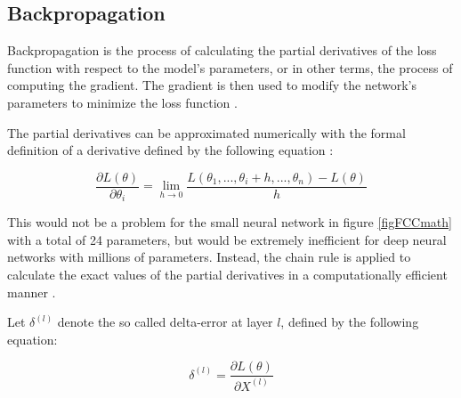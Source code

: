 \documentclass[a4paper, twoside]{article}
\newcommand*{\pd}[2]{\ensuremath{\dfrac{\partial #1}{\partial #2}}}
\newcommand*{\inpd}[2]{\ensuremath{\frac{\partial #1}{\partial #2}}}
\begin{document}
\subsection{Backpropagation}
Backpropagation is the process of calculating the partial derivatives of the loss function with respect to the model's parameters, or in other terms, the process of computing the gradient. The gradient is then used to modify the network's parameters to minimize the loss function \cite{wikiStanford} \cite{gradient}.

The partial derivatives can be approximated numerically with the formal definition of a derivative defined by the following equation \cite{wikiStanford} \cite{gradient}:

\begin{equation}\label{EQderivativeDefinition}
\pd{L(\theta)}{\theta_{i}} = \lim_{h \to 0} \frac{L(\theta_{1},...,\theta_{i} + h, ..., \theta_{n})-L(\theta)}{h}
\end{equation}

This would not be a problem for the small neural network in figure \ref{figFCCmath} with a total of 24 parameters, but would be extremely inefficient for deep neural networks with millions of parameters. Instead, the chain rule is applied to calculate the exact values of the partial derivatives in a computationally efficient manner \cite{cs231n}.

Let $\delta^{(l)}$ denote the so called delta-error at layer $l$, defined by the following equation:

\begin{equation}\label{deltaerrordefinition}
\delta^{(l)} = \inpd{L(\theta)}{X^{(l)}}
\end{equation}
\end{document}

